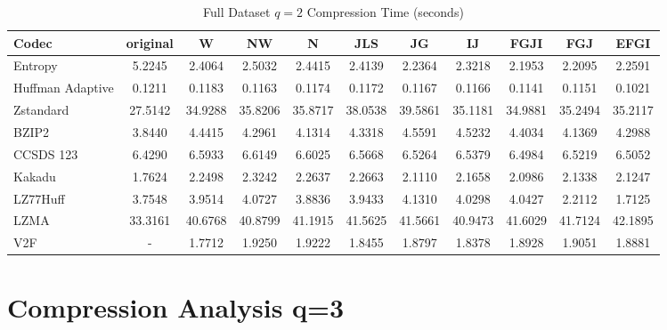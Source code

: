 \documentclass{article}
\begin{document}
\begin{table}[h!]
\centering
\caption{Full Dataset $q=2$ Compression Time (seconds)}
\begin{tabular}{|l|cccccccccc|}
\hline
Codec &  original &       W &      NW &       N &     JLS &      JG &      IJ &    FGJI &     FGJ &    EFGI \\
\hline
Entropy & 5.2245 & 2.4064 & 2.5032 & 2.4415 & 2.4139 & 2.2364 & 2.3218 & 2.1953 & 2.2095 & 2.2591         \\
\hline
Huffman Adaptive &    0.1211 &  0.1183 &  0.1163 &  0.1174 &  0.1172 &  0.1167 &  0.1166 &  0.1141 &  0.1151 &  0.1021 \\
Zstandard        &   27.5142 & 34.9288 & 35.8206 & 35.8717 & 38.0538 & 39.5861 & 35.1181 & 34.9881 & 35.2494 & 35.2117 \\
BZIP2            &    3.8440 &  4.4415 &  4.2961 &  4.1314 &  4.3318 &  4.5591 &  4.5232 &  4.4034 &  4.1369 &  4.2988 \\
CCSDS 123        &    6.4290 &  6.5933 &  6.6149 &  6.6025 &  6.5668 &  6.5264 &  6.5379 &  6.4984 &  6.5219 &  6.5052 \\
Kakadu           &    1.7624 &  2.2498 &  2.3242 &  2.2637 &  2.2663 &  2.1110 &  2.1658 &  2.0986 &  2.1338 &  2.1247 \\
LZ77Huff         &    3.7548 &  3.9514 &  4.0727 &  3.8836 &  3.9433 &  4.1310 &  4.0298 &  4.0427 &  2.2112 &  1.7125 \\
LZMA             &   33.3161 & 40.6768 & 40.8799 & 41.1915 & 41.5625 & 41.5661 & 40.9473 & 41.6029 & 41.7124 & 42.1895 \\
V2F              &    - &  1.7712 &  1.9250 &  1.9222 &  1.8455 &  1.8797 &  1.8378 &  1.8928 &  1.9051 &  1.8881 \\
\hline
\end{tabular}
\end{table}

\newpage
\section{Compression Analysis q=3}
\end{document}
